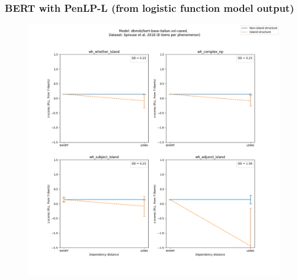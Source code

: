 \subsubsection{BERT with PenLP-L (from logistic function model output)}
\begin{figure}[h]
	\centering
	\includegraphics[width=1\textwidth]{images/AppendixA/Sprouse_wh_dbmdz_bert-base-italian-xxl-cased_PLL-zscores-likert-2022-07-11.png} 
\end{figure}

\clearpage
